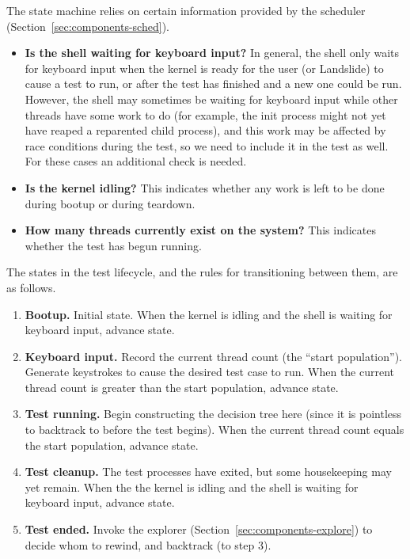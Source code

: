 The state machine relies on certain information provided by the scheduler (Section~\ref{sec:components-sched}).

\begin{itemize}
	\item {\bf Is the shell waiting for keyboard input?} In general, the shell only waits for keyboard input when the kernel is ready for the user (or Landslide) to cause a test to run, or after the test has finished and a new one could be run.
		However, the shell may sometimes be waiting for keyboard input while other threads have some work to do (for example, the init process might not yet have reaped a reparented child process), and this work may be affected by race conditions during the test, so we need to include it in the test as well. For these cases an additional check is needed.
	\item {\bf Is the kernel idling?} This indicates whether any work is left to be done during bootup or during teardown.
	\item {\bf How many threads currently exist on the system?} This indicates whether the test has begun running.
\end{itemize}

The states in the test lifecycle, and the rules for transitioning between them, are as follows.

\begin{enumerate}
	\item {\bf Bootup.} Initial state. When the kernel is idling and the shell is waiting for keyboard input, advance state.
	\item {\bf Keyboard input.} Record the current thread count (the ``start population''). Generate keystrokes to cause the desired test case to run.
		When the current thread count is greater than the start population, advance state.
	\item {\bf Test running.} Begin constructing the decision tree here (since it is pointless to backtrack to before the test begins). When the current thread count equals the start population, advance state.
	\item {\bf Test cleanup.} The test processes have exited, but some housekeeping may yet remain. When the the kernel is idling and the shell is waiting for keyboard input, advance state.
	\item {\bf Test ended.} Invoke the explorer (Section~\ref{sec:components-explore}) to decide whom to rewind, and backtrack (to step 3).
\end{enumerate}


